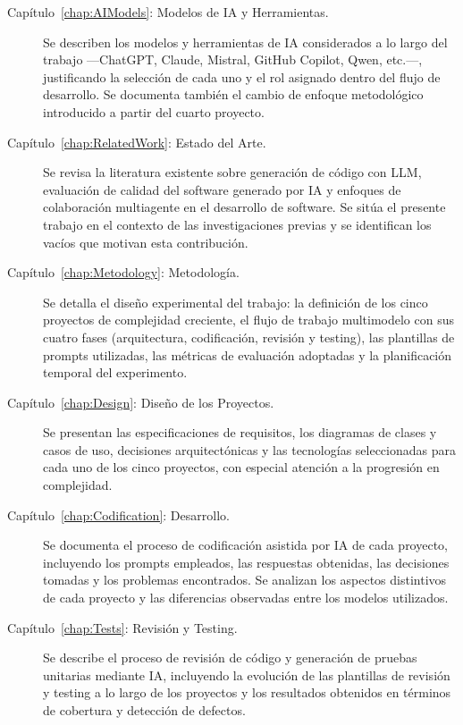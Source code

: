 \begin{description}

  \item[Capítulo~\ref{chap:AIModels}: Modelos de IA y Herramientas.] Se describen los modelos y herramientas de \ac{IA} considerados a lo largo del trabajo ---ChatGPT, Claude, Mistral, GitHub Copilot, Qwen, etc.---, justificando la selección de cada uno y el rol asignado dentro del flujo de desarrollo. Se documenta también el cambio de enfoque metodológico introducido a partir del cuarto proyecto.

  \item[Capítulo~\ref{chap:RelatedWork}: Estado del Arte.] Se revisa la literatura existente sobre generación de código con \ac{LLM}, evaluación de calidad del software generado por \ac{IA} y enfoques de colaboración multiagente en el desarrollo de software. Se sitúa el presente trabajo en el contexto de las investigaciones previas y se identifican los vacíos que motivan esta contribución.

  \item[Capítulo~\ref{chap:Metodology}: Metodología.] Se detalla el diseño experimental del trabajo: la definición de los cinco proyectos de complejidad creciente, el flujo de trabajo multimodelo con sus cuatro fases (arquitectura, codificación, revisión y testing), las plantillas de prompts utilizadas, las métricas de evaluación adoptadas y la planificación temporal del experimento.

  \item[Capítulo~\ref{chap:Design}: Diseño de los Proyectos.] Se presentan las especificaciones de requisitos, los diagramas de clases y casos de uso, decisiones arquitectónicas y las tecnologías seleccionadas para cada uno de los cinco proyectos, con especial atención a la progresión en complejidad.

  \item[Capítulo~\ref{chap:Codification}: Desarrollo.] Se documenta el proceso de codificación asistida por \ac{IA} de cada proyecto, incluyendo los prompts empleados, las respuestas obtenidas, las decisiones tomadas y los problemas encontrados. Se analizan los aspectos distintivos de cada proyecto y las diferencias observadas entre los modelos utilizados.

  \item[Capítulo~\ref{chap:Tests}: Revisión y Testing.] Se describe el proceso de revisión de código y generación de pruebas unitarias mediante \ac{IA}, incluyendo la evolución de las plantillas de revisión y testing a lo largo de los proyectos y los resultados obtenidos en términos de cobertura y detección de defectos.


\end{description}
